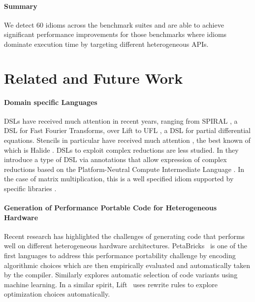 {\paragraph{Summary}
We detect 60 idioms across the benchmark suites and are able to achieve significant performance improvements for those benchmarks where idioms dominate execution time by targeting different heterogeneous APIs.

\section{Related and Future Work}

\paragraph{Domain specific Languages}
DSLs have received much attention in recent years, ranging from SPIRAL \cite{ofenbeck13spiral},
a DSL for Fast Fourier Transforms, over Lift \cite{steuwer15rewrite, SteuwerRD17,HagedornSSGD18} to
UFL \cite{Alnaes:2014:UFL:2594412.2566630}, a DSL for partial
differential equations.  Stencils in particular have received much
attention \cite{Mullapudi:2015:PAO:2694344.2694364,HagedornSSGD18}, the best known of which is Halide
\cite{Ragan-Kelley2013Halide}. DSLs to exploit complex reductions are
less studied. In \cite{Reddy2016Reduction} they introduce a type of DSL via 
 annotations
that allow expression of complex reductions based on the
Platform-Neutral Compute Intermediate Language
\cite{baghdadi2015PENCIL}. In the case of matrix multiplication,
this is a well specified idiom supported by specific libraries
\cite{clblas,mkl,cublas}.

\paragraph{Generation of Performance Portable Code for Heterogeneous Hardware}
Recent research has highlighted the challenges of generating code that performs well on different heterogeneous hardware architectures.
PetaBricks~\cite{PhothilimthanaARA13} is one of the first languages to address this performance portability challenge by encoding algorithmic choices which are then empirically evaluated and automatically taken by the compiler.
Similarly \cite{MuralidharanRHG16} explores automatic selection of code variants using machine learning.
In a similar spirit, Lift~\cite{steuwer15rewrite} uses rewrite rules to explore optimization choices automatically.

}
